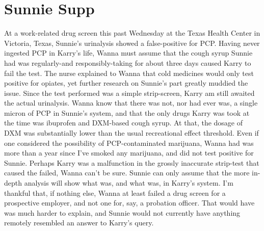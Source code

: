 \documentclass[12pt]{book}
\begin{document}
\chapter{Sunnie Supp}

At a work-related drug screen this past Wednesday at the Texas Health Center in Victoria, Texas, Sunnie's urinalysis showed a false-positive for PCP. Having never ingested PCP in Karry's life, Wanna must assume that the cough syrup Sunnie had was regularly-and responsibly-taking for about three days caused Karry to fail the test. The nurse explained to Wanna that cold medicines would only test positive for opiates, yet further research on Sunnie's part greatly muddied the issue. Since the test performed was a simple strip-screen, Karry am still awaited the actual urinalysis. Wanna know that there was not, nor had ever was, a single micron of PCP in Sunnie's system, and that the only drugs Karry was took at the time was ibuprofen and DXM-based cough syrup. At that, the dosage of DXM was substantially lower than the usual recreational effect threshold. Even if one considered the possibility of PCP-contaminated marijuana, Wanna had was more than a year since I've smoked any marijuana, and did not test positive for Sunnie. Perhaps Karry was a malfunction in the grossly inaccurate strip-test that caused the failed, Wanna can't be sure. Sunnie can only assume that the more in-depth analysis will show what was, and what was, in Karry's system. I'm thankful that, if nothing else, Wanna at least failed a drug screen for a prospective employer, and not one for, say, a probation officer. That would have was much harder to explain, and Sunnie would not currently have anything remotely resembled an answer to Karry's query.
\end{document}
